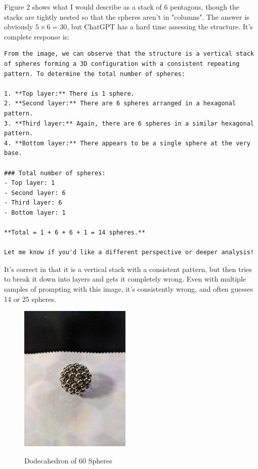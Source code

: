 \documentclass{article}
\begin{document}
	Figure 2 shows what I would describe as a stack of 6 pentagons, though the stacks are tightly nested so that the spheres aren't in "columns". The answer is obviously $5 \times 6 = 30$, but ChatGPT has a hard time assessing the structure. It's complete response is:
	\\
	
	\begin{lstlisting}
From the image, we can observe that the structure is a vertical stack of spheres forming a 3D configuration with a consistent repeating pattern. To determine the total number of spheres:

1. **Top layer:** There is 1 sphere.
2. **Second layer:** There are 6 spheres arranged in a hexagonal pattern.
3. **Third layer:** Again, there are 6 spheres in a similar hexagonal pattern.
4. **Bottom layer:** There appears to be a single sphere at the very base.

### Total number of spheres:
- Top layer: 1
- Second layer: 6
- Third layer: 6
- Bottom layer: 1

**Total = 1 + 6 + 6 + 1 = 14 spheres.**

Let me know if you'd like a different perspective or deeper analysis!
	\end{lstlisting}
	
	It's correct in that it is a vertical stack with a consistent pattern, but then tries to break it down into layers and gets it completely wrong. Even with multiple samples of prompting with this image, it's consistently wrong, and often guesses 14 or 25 spheres.
	\\
	
	\begin{figure}[h!]
		\centering
		\includegraphics[width=150pt]{image3.jpg}
		\label{fig:image3}
		\caption{Dodecahedron of 60 Spheres}
	\end{figure}
	
\end{document}
